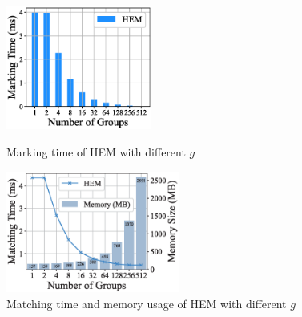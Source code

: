 \documentclass[runningheads]{llncs}
\begin{document}
\begin{figure}[tbp]
\centering
\begin{minipage}[t]{0.48\textwidth}
\centering
\includegraphics[width=4.8cm]{figures/bemarking.eps}
\caption{Marking time of HEM with different $g$}
\label{mthb}
\end{minipage}
\quad
\begin{minipage}[t]{0.48\textwidth}
\centering
 \includegraphics[width=5.7cm]{figures/matchingTime.eps}
\caption{Matching time and memory usage of HEM with different $g$}
\label{mtmc}
\end{minipage}
\end{figure}



\end{document}
